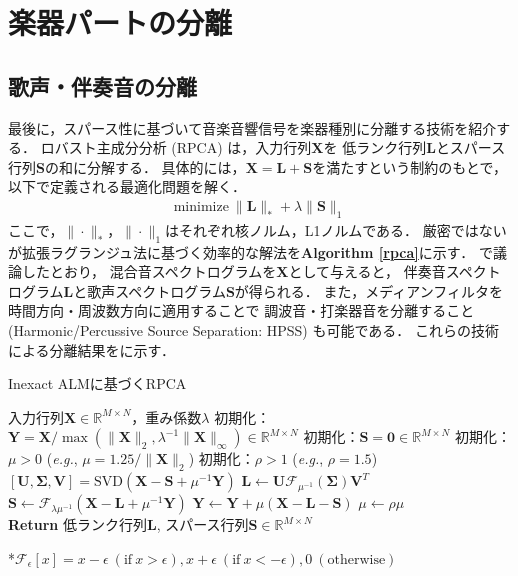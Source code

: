 \section{楽器パートの分離}

\subsection{歌声・伴奏音の分離}

最後に，スパース性に基づいて音楽音響信号を楽器種別に分離する技術を紹介する．
ロバスト主成分分析 (RPCA) は，入力行列$\bm{X}$を
低ランク行列$\bm{L}$とスパース行列$\bm{S}$の和に分解する．
具体的には，$\bm{X} = \bm{L} + \bm{S}$を満たすという制約のもとで，
以下で定義される最適化問題を解く．
\begin{align}
 \mbox{minimize} \ \|\bm{L}\|_* +\lambda \|\bm{S}\|_1
\end{align}
ここで，$\|\cdot\|_*$，$\|\cdot\|_1$はそれぞれ核ノルム，L1ノルムである．
厳密ではないが拡張ラグランジュ法に基づく効率的な解法を{\bf Algorithm \ref{rpca}}に示す．
で議論したとおり，
混合音スペクトログラムを$\bm{X}$として与えると，
伴奏音スペクトログラム$\bm{L}$と歌声スペクトログラム$\bm{S}$が得られる．
また，メディアンフィルタを時間方向・周波数方向に適用することで
調波音・打楽器音を分離すること (Harmonic/Percussive Source Separation: HPSS) 
も可能である\cite{fitzgerald:dafx:2010}．
これらの技術による分離結果をに示す．

\begin{algorithm}[t]
\caption{Inexact ALMに基づくRPCA}
\label{rpca}                          
\begin{algorithmic}[1]
\Require 入力行列$\bm{X} \in \mathbb{R}^{M \times N}$，重み係数$\lambda$
\State 初期化：$\bm{Y} = \bm{X} / \max(\|\bm{X}\|_2, \lambda^{-1}\|\bm{X}\|_\infty) \in \mathbb{R}^{M \times N}$
\State 初期化：$\bm{S} = \bm{0} \in \mathbb{R}^{M \times N}$
\State 初期化：$\mu > 0$ ({\it e.g.}, $\mu = 1.25 / \|\bm{X}\|_2 $)
\State 初期化：$\rho > 1$ ({\it e.g.}, $\rho = 1.5$)
\State $[\bm{U}, \bm\Sigma, \bm{V}] = \mbox{SVD}(\bm{X} - \bm{S} + \mu^{-1} \bm{Y})$
\State $\bm{L} \gets \bm{U} \mathcal{F}_{\mu^{-1}}(\bm\Sigma) \bm{V}^T$
\State $\bm{S} \gets \mathcal{F}_{\lambda\mu^{-1}}(\bm{X} - \bm{L} + \mu^{-1} \bm{Y})$
\State $\bm{Y} \gets \bm{Y} + \mu (\bm{X} - \bm{L} - \bm{S})$
\State $\mu \gets \rho \mu$
\EndWhile
\\
{\bf Return} 低ランク行列$\bm{L}$,
スパース行列$\bm{S} \in \mathbb{R}^{M \times N}$
\end{algorithmic}
*$\mathcal{F}_\epsilon[x] 
= x - \epsilon \ (\mbox{if} \ x > \epsilon), 
  x + \epsilon \ (\mbox{if} \ x < -\epsilon), 
  0 \ (\mbox{otherwise})$
\end{algorithm}

